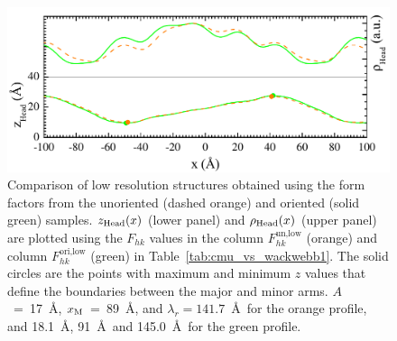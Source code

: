 \begin{figure}[htbp]
  \centering
  \includegraphics[width=\textwidth]{figures/ripple/LAXS/low-res_comparison}
  \caption[Comparison of low resolution structures obtained using the form factors from 
  the unoriented (dashed orange) and oriented (solid green) samples]
  {Comparison of low resolution structures obtained using the form factors from 
  the unoriented (dashed orange) and oriented (solid green) samples.
  $z_\text{Head}(x)$ (lower panel) and $\rho_\text{Head}(x)$ (upper panel) are plotted using 
  the $F_{hk}$ values in the column 
  $F_{hk}^\text{un,low}$ (orange) and column $F_{hk}^\text{ori,low}$ (green)
  in Table~\ref{tab:cmu_vs_wackwebb1}.
  The solid circles are the points with maximum and minimum $z$ values that 
  define the boundaries between the major and minor arms. 
  $A$~=~17~\AA, $x_\textrm{M}$~=~89~\AA, and $\lambda_r = 141.7$~\AA\ for the orange 
  profile, and 
  18.1~\AA, 91~\AA\, and 145.0~\AA\ for the green profile.}
  \label{fig:low-res_comparison}
\end{figure}

